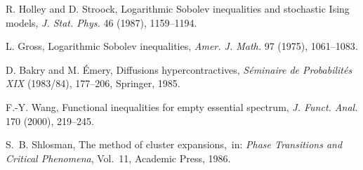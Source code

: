 \documentclass[11pt]{amsart}
\theoremstyle{plain}
\theoremstyle{definition}
\theoremstyle{remark}
\begin{document}
\begin{thebibliography}{99}
R. Holley and D. Stroock, Logarithmic Sobolev inequalities and stochastic Ising models,
\emph{J. Stat. Phys.} 46 (1987), 1159--1194.

L. Gross, Logarithmic Sobolev inequalities,
\emph{Amer. J. Math.} 97 (1975), 1061--1083.

D. Bakry and M. \'Emery, Diffusions hypercontractives,
\emph{S\'eminaire de Probabilit\'es XIX} (1983/84), 177--206, Springer, 1985.

F.-Y. Wang, Functional inequalities for empty essential spectrum,
\emph{J. Funct. Anal.} 170 (2000), 219--245.

S.~B. Shlosman, The method of cluster expansions,\
in: \emph{Phase Transitions and Critical Phenomena}, Vol.~11, Academic Press, 1986.

\end{thebibliography}
\end{document}
